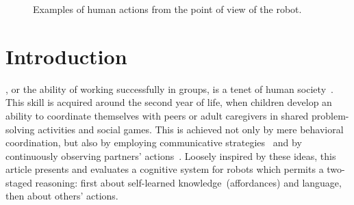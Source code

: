 
\begin{figure*}
  \centering


  \caption{Examples of human actions from the point of view of the robot.}
  \label{fig:action_examples}
\end{figure*}

\section{Introduction}
\label{sec:intro}

, or the ability of working successfully in groups, is a tenet of human society~\cite{turner:1975}.
This skill is acquired around the second year of life, when children develop an ability to coordinate themselves with peers or adult caregivers in shared problem-solving activities and social games.
This is achieved not only by mere behavioral coordination, but also by employing communicative strategies~\cite{melis:2010:rstb} and by continuously observing partners' actions~\cite{ramnani:2004:natureneuro}.
Loosely inspired by these ideas, this article presents and evaluates a cognitive system for robots which permits a two-staged reasoning: first about self-learned knowledge~(affordances) and language, then about others' actions.

